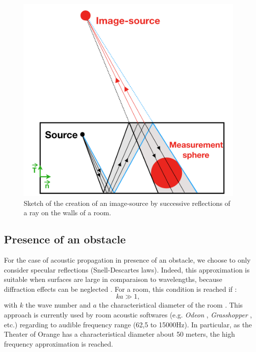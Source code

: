 \documentclass[AMA,STIX1COL]{WileyNJD-v2}
\begin{document}
%
\begin{figure}[t]
	\centering
	\includegraphics[width=0.5\linewidth]{schema_SI}
	\caption{Sketch of the creation of an image-source by successive reflections of a ray on the walls of a room.}
	\label{schema_SI}
\end{figure}



\subsection{Presence of an obstacle}
For the case of acoustic propagation in presence of an obstacle, we choose to only consider specular reflections (Snell-Descartes laws). Indeed, this approximation is suitable when surfaces are large in comparaison to wavelengths, because diffraction effects can be neglected \cite{jouhaneau}. For a room, this condition is reached if :
\begin{equation}
ka \gg 1, 
\end{equation}
with $k$ the wave number and $a$ the characteristical diameter of the room \cite{hautes_freq}. This approach is currently used by room acoustic softwares (e.g. \textit{Odeon} \cite{odeon}, \textit{Grasshopper} \cite{grasshopper}, etc.) regarding to audible frequency range (62,5 to 15000Hz). In particular, as the Theater of Orange has a characteristical diameter about 50 meters, the high frequency approximation is reached. 
\end{document}
